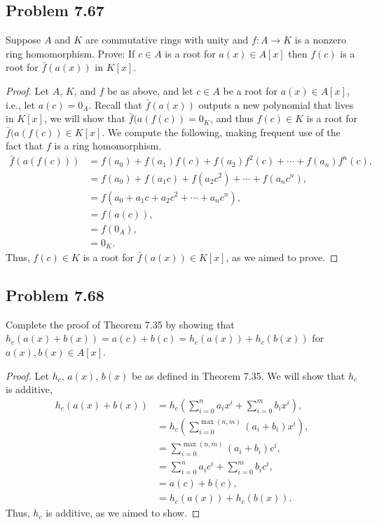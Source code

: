\documentclass[letterpaper, 12pt]{amsart}
\begin{document}
		\subsection*{Problem 7.67}
		\label{sub:problem_7_67}
		Suppose $A$ and $K$ are commutative rings with unity and $f : A \to K$ is a nonzero ring homomorphism. 
		Prove: If $c \in A$ is a root for $a(x) \in A[x]$ then $f(c)$ is a root for $\bar{f}(a(x))$ in $K[x]$.
			\begin{proof}
			Let $A$, $K$, and $f$ be as above, and let $c \in A$ be a root for $a(x) \in A[x]$, i.e., let $a(c) = 0_{A}$.
			Recall that $\bar{f}(a(x))$ outputs a new polynomial that lives in $K[x]$, we will show that $\bar{f}(a(f(c)) = 0_{K}$, and thus $f(c) \in K$ is a root for $\bar{f}(a(f(c)) \in K[x]$.
			We compute the following, making frequent use of the fact that $f$ is a ring homomorphism.
				\begin{align*}
				\bar{f}(a(f(c))) &= f(a_{0}) + f(a_{1})f(c) + f(a_{2})f^{2}(c) + \cdots + f(a_{n})f^{n}(c), \\
				&= f(a_{0}) + f(a_{1}c) + f(a_{2}c^{2}) + \cdots + f(a_{n}c^{n}), \\
				&= f\left( a_{0} + a_{1}c + a_{2}c^{2} + \cdots + a_{n}c^{n} \right), \\
				&= f(a(c)), \\
				&= f(0_{A}), \\
				&= 0_{K}.
				\end{align*}
			Thus, $f(c) \in K$ is a root for $\bar{f}(a(x)) \in K[x]$, as we aimed to prove.				
			\end{proof}

		\subsection*{Problem 7.68}
		\label{sub:problem_7_68}
		Complete the proof of Theorem 7.35 by showing that $h_{c}(a(x) + b(x)) = a(c) + b(c) = h_{c}(a(x)) + h_{c}(b(x))$ for $a(x), b(x) \in A[x]$.
			\begin{proof}
			Let $h_{c}$, $a(x)$, $b(x)$ be as defined in Theorem 7.35.
			We will show that $h_{c}$ is additive,
				\begin{align*}
				h_{c}(a(x) + b(x)) &= h_{c}\left( \sum\limits_{i=0}^{n} a_{i}x^{i} + \sum\limits_{i=0}^{m} b_{i}x^{i} \right), \\
				&= h_{c}\left( \sum\limits_{i=0}^{\max{(n,m)}} (a_{i} + b_{i})x^{i} \right), \\
				&= \sum\limits_{i=0}^{\max{(n,m)}} (a_{i} + b_{i})c^{i}, \\
				&= \sum\limits_{i=0}^{n} a_{i}c^{i} + \sum\limits_{i=0}^{m} b_{i}c^{i}, \\
				&= a(c) + b(c), \\
				&= h_{c}(a(x)) + h_{c}(b(x)).
				\end{align*}
			Thus, $h_{c}$ is additive, as we aimed to show.				
			\end{proof}
\end{document}

